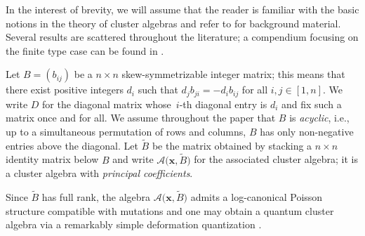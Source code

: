 \documentclass[pdftex]{sigma}
\newcommand{\bfx}{\mathbf{x}}
\newcommand{\cA}{\mathcal{A}}
\numberwithin{equation}{section}
\begin{document}
In the interest of brevity, we will assume that the reader is familiar with the basic notions in the theory of cluster algebras and refer to \cite{fomin-zelevinsky4} for background material. Several results are scattered throughout the literature; a compendium focusing on the finite type case can be found in \cite{hohlweg-pilaud-stella}.

Let $B=(b_{ij})$ be a $n\times n$ skew-symmetrizable integer matrix; this means that there exist positive integers $d_i$ such that $d_jb_{ji}=-d_ib_{ij}$ for all $i,j\in[1,n]$. We write $D$ for the diagonal matrix whose~$i$-th diagonal entry is $d_i$ and fix such a matrix once and for all. We assume throughout the paper that $B$ is {\it acyclic}, i.e., up to a simultaneous permutation of rows and columns, $B$ has only non-negative entries above the diagonal. Let $\widetilde{B}$ be the matrix obtained by stacking a $n\times n$ identity matrix below $B$ and write $\cA\big(\bfx,\widetilde{B}\big)$ for the associated cluster algebra; it is a cluster algebra with {\it principal coefficients}.

Since $\widetilde{B}$ has full rank, the algebra $\cA\big(\bfx,\widetilde{B}\big)$ admits a log-canonical Poisson structure compatible with mutations \cite{gekhtman-shapiro-vainshtein} and one may obtain a quantum cluster algebra via a remarkably simple deformation quantization \cite{berenstein-zelevinsky}.
\end{document}
